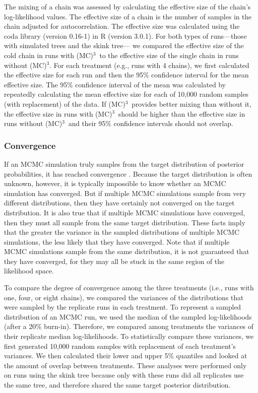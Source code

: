 \documentclass[12pt]{article}
\newcommand{\MCMCMC}{(MC)$^{3}$}
\begin{document}
The mixing of a chain was assessed by calculating
the effective size of the chain's log-likelihood values.
%
The effective size of a chain is the number of samples
in the chain adjusted for autocorrelation.
%
The effective size was calculated using
the coda library (version 0.16-1) in R (version 3.0.1).
%
For both types of runs---those with simulated trees and the skink tree---%
we compared the effective size of the cold chain in runs with \MCMCMC\ 
to the effective size of the single chain in runs without \MCMCMC.
%
For each treatment (e.g., runs with 4 chains),
we first calculated the effective size for each run
and then the 95\% confidence interval for the mean effective size.
%
The 95\% confidence interval of the mean was calculated
by repeatedly calculating the mean effective size
for each of 10,000 random samples (with replacement) of the data.
%
If \MCMCMC\ provides better mixing than without it,
the effective size in runs with \MCMCMC\ should be higher
than the effective size in runs without \MCMCMC\ 
and their 95\% confidence intervals should not overlap.


\subsubsection*{Convergence}

If an MCMC simulation truly samples from the target distribution
of posterior probabilities, it has reached convergence \citep{giv05}.
%
Because the target distribution is often unknown, however,
it is typically impossible to know whether an MCMC simulation has converged.
%
But if multiple MCMC simulations sample from very different distributions,
then they have certainly not converged on the target distribution.
%
It is also true that if multiple MCMC simulations have converged,
then they must all sample from the same target distribution.
%
These facts imply that the greater the variance in the sampled distributions
of multiple MCMC simulations, the less likely that they have converged.
%
Note that if multiple MCMC simulations sample from the same distribution,
it is not guaranteed that they have converged,
for they may all be stuck in the same region of the likelihood space.


To compare the degree of convergence among the three treatments
(i.e., runs with one, four, or eight chains),
we compared the variances of the distributions
that were sampled by the replicate runs in each treatment.
%
To represent a sampled distribution of an MCMC run,
we used the median of the sampled log-likelihoods (after a 20\% burn-in).
%
Therefore, we compared among treatments
the variances of their replicate median log-likelihoods.
%
To statistically compare these variances,
we first generated 10,000 random samples with replacement
of each treatment's variances.
%
We then calculated their lower and upper 5\% quantiles
and looked at the amount of overlap between treatments.
%
These analyses were performed only on runs using the skink tree
because only with these runs did all replicates use the same tree,
and therefore shared the same target posterior distribution.
\end{document}
